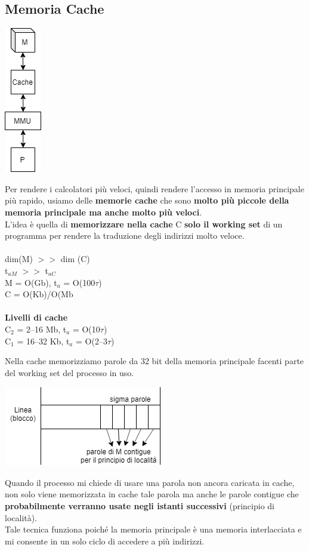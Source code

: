 \documentclass[10pt]{report}
\begin{document}
\subsection{Memoria Cache}
\begin{multicols}{2}
\begin{center}
\includegraphics[scale=1]{memhierarchy.png}
\end{center}
Per rendere i calcolatori più veloci, quindi rendere l'accesso in memoria principale più rapido, usiamo delle \textbf{memorie cache} che sono \textbf{molto più piccole della memoria principale ma anche molto più veloci}.\\
L'idea è quella di \textbf{memorizzare nella cache} C \textbf{solo il working set} di un programma per rendere la traduzione degli indirizzi molto veloce.\\\\
dim(M) $>>$ dim (C)\\
t$_{aM}$ $>>$ t$_{aC}$\\
M = O(Gb), t$_a$ = O(100$\tau$)\\
C = O(Kb)/O(Mb\\\\
\textbf{Livelli di cache}\\
C$_2$ = 2--16 Mb, t$_a$ = O(10$\tau$)\\
C$_1$ = 16--32 Kb, t$_a$ = O(2--3$\tau$)
\end{multicols}
\pagebreak
Nella cache memorizziamo parole da 32 bit della memoria principale facenti parte del working set del processo in uso.
\begin{multicols}{2}
\begin{center}
\includegraphics[scale=0.9]{cacheline.png}
\end{center}
Quando il processo mi chiede di usare una parola non ancora caricata in cache, non solo viene memorizzata in cache tale parola ma anche le parole contigue che \textbf{probabilmente verranno usate negli istanti successivi} (principio di località).\\
Tale tecnica funziona poiché la memoria principale è una memoria interlacciata e mi consente in un solo ciclo di accedere a più indirizzi.
\end{multicols}
\end{document}
